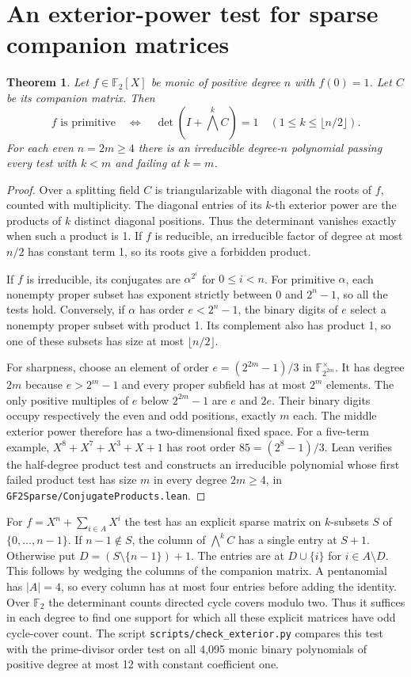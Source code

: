\documentclass[11pt]{article}
\newtheorem{theorem}{Theorem}
\newcommand{\F}{\mathbb F_2}
\begin{document}
\section{An exterior-power test for sparse companion matrices}
\begin{theorem}\label{thm:exterior}
Let \(f\in\F[X]\) be monic of positive degree \(n\) with \(f(0)=1\).
Let \(C\) be its companion matrix. Then
\[
 f\text{ is primitive}\quad\Longleftrightarrow\quad
 \det(I+\textstyle\bigwedge^k C)=1
 \quad(1\le k\le\lfloor n/2\rfloor).
\]
For each even \(n=2m\ge4\) there is an irreducible degree-\(n\)
polynomial passing every test with \(k<m\) and failing at \(k=m\).
\end{theorem}
\begin{proof}
Over a splitting field \(C\) is triangularizable with diagonal the
roots of \(f\), counted with multiplicity. The diagonal entries of its
\(k\)-th exterior power are the products of \(k\) distinct diagonal
positions. Thus the determinant vanishes exactly when such a product is
1. If \(f\) is reducible, an irreducible factor of degree at most \(n/2\)
has constant term 1, so its roots give a forbidden product.

If \(f\) is irreducible, its conjugates are \(\alpha^{2^i}\) for
\(0\le i<n\). For primitive \(\alpha\), each nonempty proper subset has
exponent strictly between 0 and \(2^n-1\), so all the tests hold.
Conversely, if \(\alpha\) has
order \(e<2^n-1\), the binary digits of \(e\) select a nonempty
proper subset with product 1. Its complement also has product 1,
so one of these subsets has size at most \(\lfloor n/2\rfloor\).

For sharpness, choose an element of order \(e=(2^{2m}-1)/3\)
in \(\mathbb F_{2^{2m}}^\times\). It has degree \(2m\) because
\(e>2^m-1\) and every proper subfield has at most \(2^m\) elements.
The only positive multiples of \(e\) below \(2^{2m}-1\) are \(e\)
and \(2e\). Their binary digits occupy respectively the even and odd
positions, exactly \(m\) each. The middle exterior power therefore
has a two-dimensional fixed space. For a five-term example,
\(X^8+X^7+X^3+X+1\) has root order \(85=(2^8-1)/3\).
Lean verifies the half-degree product test and constructs an irreducible
polynomial whose first failed product test has size \(m\) in every
degree \(2m\ge4\), in \texttt{GF2Sparse/ConjugateProducts.lean}.
\end{proof}

For \(f=X^n+\sum_{i\in A}X^i\) the test has an explicit sparse matrix
on \(k\)-subsets \(S\) of \(\{0,\ldots,n-1\}\). If \(n-1\notin S\),
the column of \(\bigwedge^k C\) has a single entry at \(S+1\).
Otherwise put \(D=(S\setminus\{n-1\})+1\). The entries are at
\(D\cup\{i\}\) for \(i\in A\setminus D\). This follows by wedging
the columns of the companion matrix. A pentanomial has \(|A|=4\),
so every column has at most four entries before adding the identity.
Over \(\F\) the determinant counts directed cycle covers modulo two.
Thus it suffices in each degree to find one support for which all
these explicit matrices have odd cycle-cover count. The script
\texttt{scripts/check\_exterior.py} compares this test with the
prime-divisor order test on all 4,095 monic binary polynomials of
positive degree at most 12 with constant coefficient one.
\end{document}

